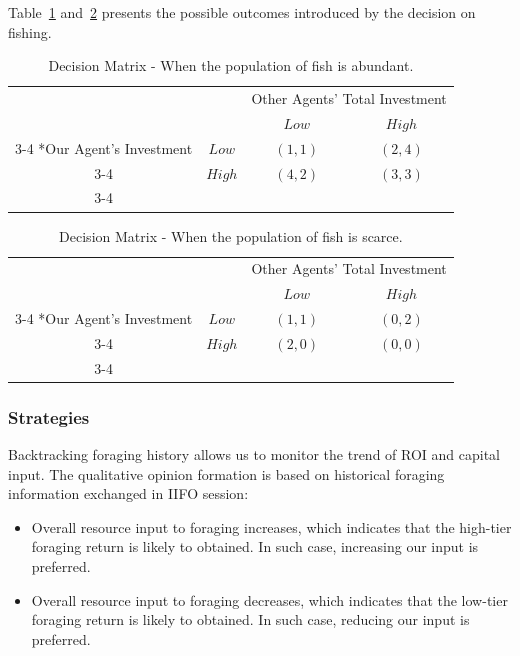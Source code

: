 Table~\ref{table:FishAbundant} and~\ref{table:FishScarce} presents the possible outcomes introduced by the decision on fishing. 

\begin{table}[!htb]
    \setlength{\extrarowheight}{2pt}
    \begin{tabular}{cc|c|c|}
      & \multicolumn{1}{c}{} & \multicolumn{2}{c}{Other Agents' Total Investment}\\
      & \multicolumn{1}{c}{} & \multicolumn{1}{c}{$Low$}  & \multicolumn{1}{c}{$High$} \\\cline{3-4}
      \multirow{2}*{Our Agent's Investment}  & $Low$ & $(1,1)$ & $(2,4)$ \\\cline{3-4}
      & $High$ & $(4,2)$ & $(3,3)$ \\\cline{3-4}
    \end{tabular}
    \caption{Decision Matrix - When the population of fish is abundant.}\label{table:FishAbundant}
\end{table}

\begin{table}[!htb]
    \setlength{\extrarowheight}{2pt}
    \begin{tabular}{cc|c|c|}
      & \multicolumn{1}{c}{} & \multicolumn{2}{c}{Other Agents' Total Investment}\\
      & \multicolumn{1}{c}{} & \multicolumn{1}{c}{$Low$}  & \multicolumn{1}{c}{$High$} \\\cline{3-4}
      \multirow{2}*{Our Agent's Investment}  & $Low$ & $(1,1)$ & $(0,2)$ \\\cline{3-4}
      & $High$ & $(2,0)$ & $(0,0)$ \\\cline{3-4}
    \end{tabular}
    \caption{Decision Matrix - When the population of fish is scarce.}\label{table:FishScarce}
\end{table}
\subsubsection{Strategies} \label{subsubsec:Team6_Foraging:Strategies}
Backtracking foraging history allows us to monitor the trend of ROI and capital input. The qualitative opinion formation is based on historical foraging information exchanged in IIFO session: 
\begin{itemize}
    \item Overall resource input to foraging increases, which indicates that the high-tier foraging return is likely to obtained. In such case, increasing our input is preferred.
    \item Overall resource input to foraging decreases, which indicates that the low-tier foraging return is likely to obtained. In such case, reducing our input is preferred.
\end{itemize}

